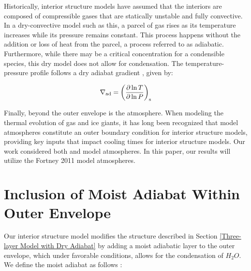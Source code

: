\documentclass[11pt]{ucscthesisbs}
\begin{document}
Historically, interior structure models have assumed that the interiors are composed of compressible gases that are statically unstable and fully convective. In a dry-convective model such as this, a parcel of gas rises as its temperature increases while its pressure remains constant. This process happens without the addition or loss of heat from the parcel, a process referred to as adiabatic. Furthermore, while there may be a critical concentration for a condensible species, this dry model does not allow for condensation. The temperature-pressure profile follows a dry adiabat gradient \citep{kippenhahn_2012}, given by:

\begin{equation}
  \nabla_{\rm ad} = \left( \frac{\partial \ln T}{\partial \ln P} \right)_{\rm s}
\end{equation}

Finally, beyond the outer envelope is the atmosphere. When modeling the thermal evolution of gas and ice giants, it has long been recognized that model atmospheres constitute an outer boundary condition for interior structure models, providing key inputs that impact cooling times for interior structure models. Our work considered both \citep{graboske_1975} and \citep{fortney_2011} model atmospheres. In this paper, our results will utilize the Fortney 2011 model atmospheres. 

\section{Inclusion of Moist Adiabat Within Outer Envelope}
Our interior structure model modifies the structure described in Section \ref{Three-layer Model with Dry Adiabat} by adding a moist adiabatic layer to the outer envelope, which under favorable conditions, allows for the condensation of $H_{2}O$. We define the moist adiabat as follows \citep{robinson_2016}:
\end{document}
